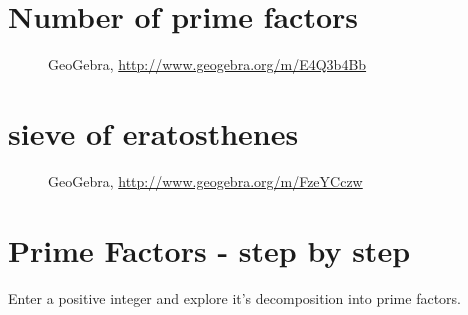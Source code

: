 \section{{Number of prime factors}}
\begin{figure}[H]
\begin{center}
\caption*{GeoGebra, \url{http://www.geogebra.org/m/E4Q3b4Bb}}
\end{center}
\end{figure}

\section{{sieve of eratosthenes}}
\begin{figure}[H]
\begin{center}
\caption*{GeoGebra, \url{http://www.geogebra.org/m/FzeYCczw}}
\end{center}
\end{figure}

\section{{Prime Factors - step by step}}
Enter a positive integer and explore it's decomposition into prime factors.


